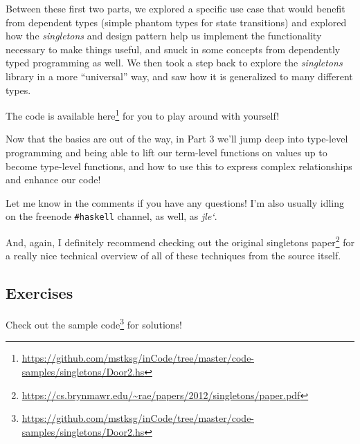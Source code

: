 \documentclass[]{article}
\renewcommand{\href}[2]{#2\footnote{\url{#1}}}
\begin{document}
Between these first two parts, we explored a specific use case that would
benefit from dependent types (simple phantom types for state transitions) and
explored how the \emph{singletons} and design pattern help us implement the
functionality necessary to make things useful, and snuck in some concepts from
dependently typed programming as well. We then took a step back to explore the
\emph{singletons} library in a more ``universal'' way, and saw how it is
generalized to many different types.

The code is available
\href{https://github.com/mstksg/inCode/tree/master/code-samples/singletons/Door2.hs}{here}
for you to play around with yourself!

Now that the basics are out of the way, in Part 3 we'll jump deep into
type-level programming and being able to lift our term-level functions on values
up to become type-level functions, and how to use this to express complex
relationships and enhance our code!

Let me know in the comments if you have any questions! I'm also usually idling
on the freenode \texttt{\#haskell} channel, as well, as \emph{jle`}.

And, again, I definitely recommend checking out the
\href{https://cs.brynmawr.edu/~rae/papers/2012/singletons/paper.pdf}{original
singletons paper} for a really nice technical overview of all of these
techniques from the source itself.

\hypertarget{exercises}{%
\subsection{Exercises}\label{exercises}}

Check out the
\href{https://github.com/mstksg/inCode/tree/master/code-samples/singletons/Door2.hs}{sample
code} for solutions!
\end{document}
